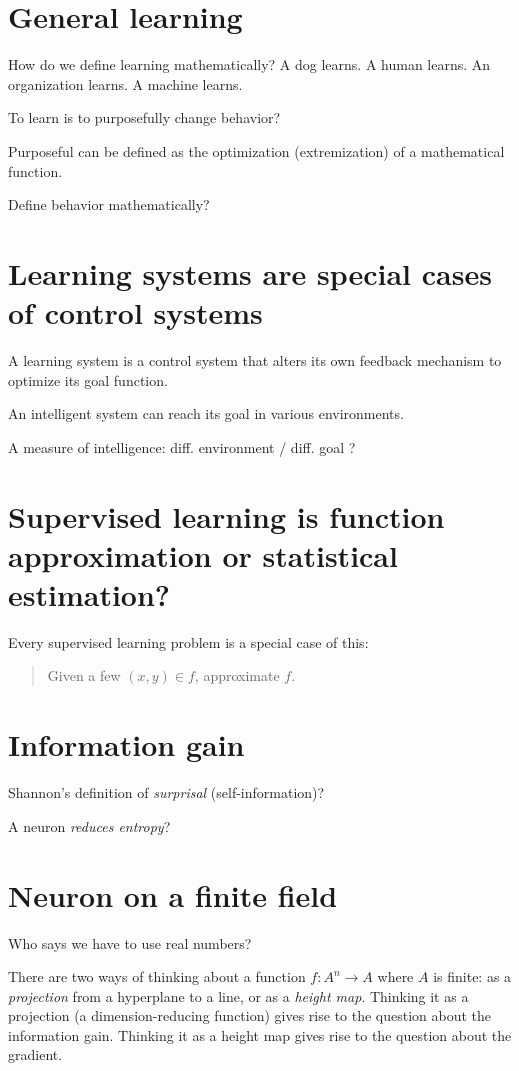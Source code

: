 \section{General learning}

How do we define learning mathematically?
A dog learns. A human learns. An organization learns. A machine learns.

To learn is to purposefully change behavior?

Purposeful can be defined as the optimization (extremization) of a mathematical function.

Define behavior mathematically?

\section{Learning systems are special cases of control systems}

A learning system is a control system that alters
its own feedback mechanism to optimize its goal function.

An intelligent system can reach its goal in various environments.

A measure of intelligence: diff. environment / diff. goal ?

\section{Supervised learning is function approximation or statistical estimation?}

Every supervised learning problem is a special case of this:
\begin{quote}
Given a few \((x,y) \in f\), approximate \(f\).
\end{quote}

\section{Information gain}

Shannon's definition of \emph{surprisal} (self-information)?

A neuron \emph{reduces entropy}?

\section{Neuron on a finite field}

Who says we have to use real numbers?

There are two ways of thinking about a function \(f : A^n \to A\) where \(A\) is finite:
as a \emph{projection} from a hyperplane to a line,
or as a \emph{height map}.
Thinking it as a projection (a dimension-reducing function)
gives rise to the question about the information gain.
Thinking it as a height map gives rise to the question about the gradient.

